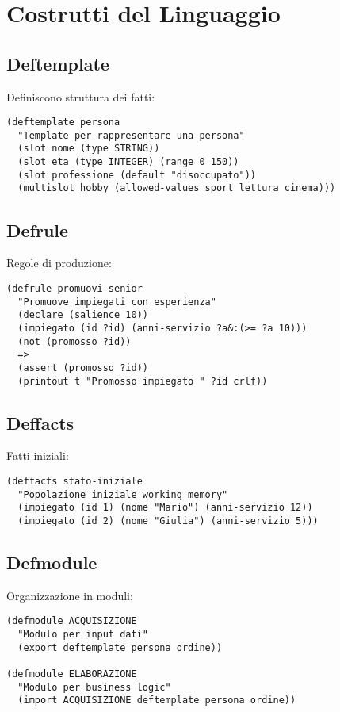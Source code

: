 \section{Costrutti del Linguaggio}

\subsection{Deftemplate}

Definiscono struttura dei fatti:

\begin{lstlisting}[language=CLIPS]
(deftemplate persona
  "Template per rappresentare una persona"
  (slot nome (type STRING))
  (slot eta (type INTEGER) (range 0 150))
  (slot professione (default "disoccupato"))
  (multislot hobby (allowed-values sport lettura cinema)))
\end{lstlisting}

\subsection{Defrule}

Regole di produzione:

\begin{lstlisting}[language=CLIPS]
(defrule promuovi-senior
  "Promuove impiegati con esperienza"
  (declare (salience 10))
  (impiegato (id ?id) (anni-servizio ?a&:(>= ?a 10)))
  (not (promosso ?id))
  =>
  (assert (promosso ?id))
  (printout t "Promosso impiegato " ?id crlf))
\end{lstlisting}

\subsection{Deffacts}

Fatti iniziali:

\begin{lstlisting}[language=CLIPS]
(deffacts stato-iniziale
  "Popolazione iniziale working memory"
  (impiegato (id 1) (nome "Mario") (anni-servizio 12))
  (impiegato (id 2) (nome "Giulia") (anni-servizio 5)))
\end{lstlisting}

\subsection{Defmodule}

Organizzazione in moduli:

\begin{lstlisting}[language=CLIPS]
(defmodule ACQUISIZIONE
  "Modulo per input dati"
  (export deftemplate persona ordine))

(defmodule ELABORAZIONE
  "Modulo per business logic"
  (import ACQUISIZIONE deftemplate persona ordine))
\end{lstlisting}

